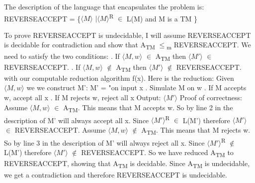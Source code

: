 \documentclass[11pt]{article}
\newcommand\question[2]{
\shadowbox{
\begin{minipage}{45em}\vspace{1ex}\textbf{Problem #1}
\newline
\vspace{1ex}
\end{minipage}
}
\vspace{1ex}
}
\begin{document}
\question{4}{John X and Jane Y} %

\begin{enumerate}

The description of the language that encapsulates the problem is:
\newline
\newline
REVERSEACCEPT = \{$\langle M\rangle$ \text{}$|$\text{ }$\langle M\rangle$\textsuperscript{R} $\in$ L(M) and M is a TM \}
\newline
\newline

To prove REVERSEACCEPT is undecidable, I will assume REVERSEACCEPT is decidable for contradiction and show that A\textsubscript{TM} $\leq$\textsubscript{m} REVERSEACCEPT.
\newline
\newline
We need to satisfy the two conditions:
\newline
{}. If $\langle M, w \rangle$ $\in$ A\textsubscript{TM} then $\langle M' \rangle$ $\in$ REVERSEACCEPT.
. If $\langle M, w \rangle$ $\notin$ A\textsubscript{TM} then $\langle M' \rangle$ $\notin$ REVERSEACCEPT.
\newline
\newline
with our computable reduction algorithm f(x). Here is the reduction:
\newline
\newline
Given $\langle M, w \rangle$ we we construct M':
\newline
\newline
M' = "on input x
. Simulate M on w
. If M accepts w, accept all x
. If M rejects w, reject all x
\newline
\newline
Output:  $\langle M'\rangle$
\newline
\newline
Proof of correctness:
\newline
Assume $\langle M, w \rangle$ $\in$ A\textsubscript{TM}. This means that M accepts w. So by line 2 in the description of M' will always accept all x. Since $\langle M' \rangle$\textsuperscript{R} $\in$ L(M') therefore $\langle M' \rangle$ $\in$ REVERSEACCEPT.
\newline
Assume $\langle M, w \rangle$ $\notin$ A\textsubscript{TM}. This means that M rejects w. So by line 3 in the description of M' will always reject all x. Since $\langle M' \rangle$\textsuperscript{R} $\notin$ L(M') therefore $\langle M' \rangle$ $\notin$ REVERSEACCEPT.
\newline
\newline
So we have reduced A\textsubscript{TM} to REVERSEACCEPT, showing that A\textsubscript{TM} is decidable. Since A\textsubscript{TM} is undecidable, we get a contradiction and therefore REVERSEACCEPT is undecidable.
\end{enumerate}
\newpage
\end{document}
